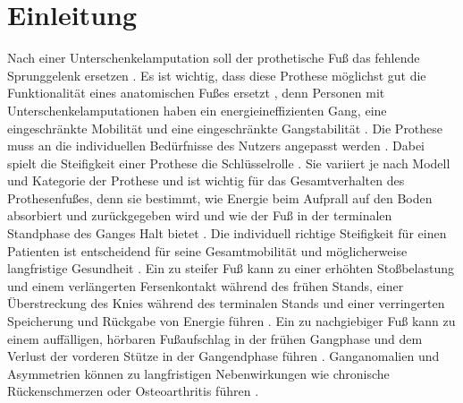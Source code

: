 \section{Einleitung}
Nach einer Unterschenkelamputation soll der prothetische Fuß das fehlende Sprunggelenk ersetzen \cite{Louessard.2022}. Es ist wichtig, dass diese Prothese möglichst gut die Funktionalität eines anatomischen Fußes ersetzt \cite{Stevens.2018}, denn Personen mit Unterschenkelamputationen haben ein energieineffizienten Gang, eine eingeschränkte Mobilität und eine eingeschränkte Gangstabilität \cite{Major.2014}\cite{Vaca.2022}.
Die Prothese muss an die individuellen Bedürfnisse des Nutzers angepasst werden \cite{Stevens.2018}. Dabei spielt die Steifigkeit einer Prothese die Schlüsselrolle \cite{Shepherd.2020}. 
Sie variiert je nach Modell und Kategorie der Prothese und ist wichtig für das Gesamtverhalten des Prothesenfußes, denn sie bestimmt, wie Energie beim Aufprall auf den Boden absorbiert und zurückgegeben wird und wie der Fuß in der terminalen Standphase des Ganges Halt bietet \cite{Shepherd.2020}. Die individuell richtige Steifigkeit für einen Patienten ist entscheidend für seine Gesamtmobilität und möglicherweise langfristige Gesundheit \cite{Shepherd.2020}. 
Ein zu steifer Fuß kann zu einer erhöhten Stoßbelastung und einem verlängerten Fersenkontakt während des frühen Stands, einer Überstreckung des Knies während des terminalen Stands und einer verringerten Speicherung und Rückgabe von Energie führen \cite{Shepherd.2020}. Ein zu nachgiebiger Fuß kann zu einem auffälligen, hörbaren Fußaufschlag in der frühen Gangphase und dem Verlust der vorderen Stütze in der Gangendphase führen \cite{Shepherd.2020}. 
Ganganomalien und Asymmetrien können zu langfristigen Nebenwirkungen wie chronische Rückenschmerzen oder Osteoarthritis führen \cite{Shepherd.2020}.


